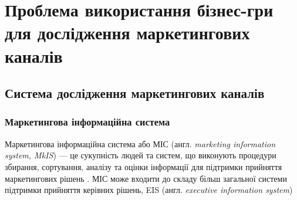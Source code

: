 ﻿\section{Проблема використання бізнес-гри для дослідження маркетингових каналів}
    \subsection{Система дослідження маркетингових каналів}
        \subsubsection{Маркетингова інформаційна система}
Маркетингова інформаційна система або МІС (англ. {\it marketing information system, MkIS}) --- це сукупність людей та систем, що виконують процедури збирання, сортування, аналізу та оцінки інформації для підтримки прийняття маркетингових рішень \cite{kotler14}. МІС може входити до складу більш загальної системи підтримки прийняття керівних рішень, EIS (англ. {\it executive information system})
        
